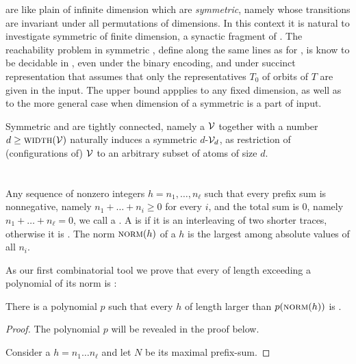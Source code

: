\documentclass[a4paper,UKenglish,cleveref, autoref, thm-restate,dvipsnames,anonymous]{lipics-v2021}
\begin{document}
\begin{example}
\end{example}

\donevass are like plain \vass of infinite dimension which are \emph{symmetric}, namely
whose transitions are invariant under all permutations of dimensions.
In this context it is natural to investigate symmetric \vass of finite dimension,
a synactic fragment of \vass.
The reachability problem in symmetric \vass, define along the same lines as for
\donevass, is know to be decidable in \pspace \cite{KL25},
even under the binary encoding, and under succinct representation that assumes that
only the representatives $T_0$ of orbits of $T$ are given in the input.
The \pspace upper bound appplies to any fixed dimension, as well as to the more general
case when dimension of a symmetric \vass is a part of input.

Symmetric \vass and \donevass are tightly connected, namely
a \donevass $\mathcal{V}$ together with a number $d\geq\textsc{width}(\mathcal{V})$ naturally induces 
a symmetric $d$-\vass ${\mathcal{V}}_{d}$, as restriction of (configurations of)
$\mathcal{V}$ to an arbitrary subset of atoms of size $d$.


\section{\Decomp {}}

Any sequence of nonzero integers $h = n_1, \ldots, n_\ell$ such that every 
prefix sum is nonnegative, namely $n_1 + \ldots + n_i \geq 0$ for every $i$,
and the total sum is 0, namely $n_1 + \ldots + n_\ell = 0$, we call a
\emph{\trace}.
A \trace is \emph{\decomp} if it is an interleaving of two shorter traces,
otherwise it is \emph{\indecomp}.
The norm $\textsc{norm}(h)$ of a \trace $h$ is the largest among absolute values of all $n_i$. 

\begin{example}
\end{example}

As our first combinatorial tool we prove that every \trace of length exceeding a polynomial
of its norm is \decomp:
\begin{lemma} \label{lem:decomp}
    There is a polynomial $p$ such that every \trace $h$ of length larger than $p(\textsc{norm}(h))$
    is \decomp.
\end{lemma}
%
\begin{proof}

    The polynomial $p$ will be revealed in the proof below.

    Consider a \trace $h = n_1 \ldots n_\ell$ and let $N$ be its maximal prefix-sum.


\end{proof}
\end{document}
